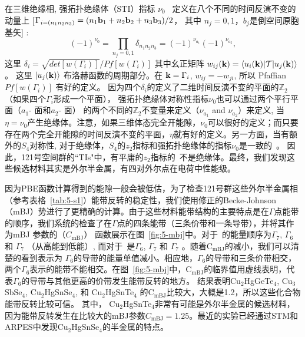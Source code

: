 在三维绝缘相, 强拓扑绝缘体（STI）指标 $\nu_0$~\citep{Fu2007topo} 定义在八个不同的时间反演不变的动量上 [$\Gamma_{i=(n_1n_2n_3)}=(n_1 {\bf b}_1+n_2 {\bf b}_2+n_3{\bf b}_3)/2$， 其中 $n_j=0,1$，$b_j$是倒空间原胞基矢] : 
\begin{equation*}
(-1)^{\nu_0}=\prod_{n_j=0,1}  \delta_{n_1n_2n_3}=(-1)^{\nu_{a_1}}(-1)^{\nu_{a_2}},
\end{equation*}
这里 $\delta_i=\sqrt{det[w(\Gamma_i)]}/Pf[w(\Gamma_i)]$ 其中幺正矩阵 $w_{ij}({\bf k})=\left\langle u_i({\bf k}) | {\cal T}|u_j({\bf k}) \right\rangle$。 这里 $\left|u_j({\bf k})\right\rangle$ 布洛赫函数的周期部分。在 ${\bf k}=\Gamma_i$, $w_{ij} =-w_{ji}$, 所以 Pfaffian $Pf[w(\Gamma_i)]$ 有好的定义。
因为四个$\delta_i$的定义了二维时间反演不变的平面的$\mathbb Z_2$（如果四个$\Gamma_i$形成一个平面），
强拓扑绝缘体对称性指标$\nu_0$也可以通过两个平行平面（$a_1$- 面和$a_2$- 面） 的两个不同的$\mathbb Z_2$不变量来定义（$\nu_{a_1}$ and $\nu_{a_2}$）来定义, 当$\eta=\nu_0$产生绝缘体。注意，如果三维体态完全开能隙，$\nu_0$可以很好的定义；而只要存在两个完全开能隙的时间反演不变的平面，$\eta$就有好的定义。另一方面，当有额外的$S_4$对称性, 对于绝缘体，$S_4$的$z_2$指标和强拓扑绝缘体的指标$\nu_0$是一致的~\citep{song2017,haruki2018}。
因此，121号空间群的``TIs"中，有平庸的$z_2$指标的\wsm~不是绝缘体。最终，我们发现这些候选材料其实是外尔半金属，有四对外尔点在电荷中性能级。

因为PBE函数计算得到的能隙一般会被低估，为了检查121号群这些外尔半金属相 （参考表格~\ref{tab:5-s1}）能带反转的稳定性，我们使用修正的Becke-Johnson（mBJ）势进行了更精确的计算。由于这些材料能带结构的主要特点是在$\Gamma$点能带的顺序，我们系统的检查了在$\Gamma$点的四条能带（三条价带和一条导带），并将其作为mBJ 参数的（$C_\text{mBJ}$） 函数展示在图~\ref{fig:5-mbj}中。对于\tii~的能量顺序为$\Gamma_7$, $\Gamma_6$ 和 $\Gamma_7$ （从高能到低能）, 而对于\wsm~是$\Gamma_6$, $\Gamma_7$ 和 $\Gamma_7$ 。随着C$_{\text{mBJ}}$的减小，我们可以清楚的看到表示为 $\Gamma_6$的导带的能量单值减小。相应地，$\Gamma_6$的导带和三条价带相交，两个$\Gamma_6$表示的能带不能相交。在图~\ref{fig:5-mbj}中，C$_{\text{mBJ}}$的临界值用虚线表明，代表$\Gamma_6$的导带与其他更高的价带发生能带反转的地方。
结果表明Cu$_2$HgGeTe$_4$, Cu$_3$SbSe$_4$, Cu$_2$HgSnSe$_4$, 和  Cu$_2$HgSnTe$_4$ 的C$_{\text{mBJ}}$比较大，大概是1.2，所以这些化合物能带反转比较可信。
其中， Cu$_2$HgSnTe$_4$非常有可能是外尔半金属的候选材料，因为能带反转发生在比较大的mBJ参数$C_\text{mBJ}=1.25$。最近的实验\citep{PhysRevB.100.195147}已经通过STM和ARPES中发现Cu$_2$HgSnSe$_4$的半金属的特点。
 


